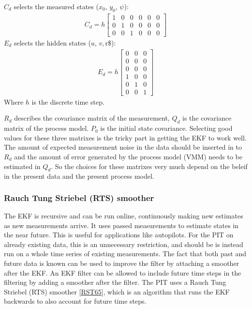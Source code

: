 \documentclass[review]{elsarticle}
\begin{document}
\sphinxAtStartPar
\(C_d\) selects the measured states (\(x_0\), \(y_0\), \(\psi\)):
\begin{equation}\label{equation:04.01_EK:eqcd}
\begin{split}\displaystyle C_{d} = h \left[\begin{matrix}1 & 0 & 0 & 0 & 0 & 0\\0 & 1 & 0 & 0 & 0 & 0\\0 & 0 & 1 & 0 & 0 & 0\end{matrix}\right]\end{split}
\end{equation}
\sphinxAtStartPar
\(E_d\) selects the hidden states (\(u\), \(v, \)r\$):
\begin{equation}\label{equation:04.01_EK:eqed}
\begin{split}\displaystyle E_{d} = h \left[\begin{matrix}0 & 0 & 0\\0 & 0 & 0\\0 & 0 & 0\\1 & 0 & 0\\0 & 1 & 0\\0 & 0 & 1\end{matrix}\right]\end{split}
\end{equation}
\sphinxAtStartPar
Where \(h\) is the discrete time step.

\sphinxAtStartPar
\(R_d\) describes the covariance matrix of the measurement, \(Q_d\) is the covariance matrix of the process model. \(P_0\) is the initial state covariance.
Selecting good values for these three matrixes is the tricky part in getting the EKF to work well. The amount of expected measurement noise in the data should be inserted in to \(R_d\) and the amount of error generated by the process model (VMM) needs to be estimated in \(Q_d\). So the choices for these matrixes very much depend on the beleif in the present data and the present process model.


\subsubsection{Rauch Tung Striebel (RTS) smoother}
\label{\detokenize{04.01_EK:rauch-tung-striebel-rts-smoother}}\label{\detokenize{04.01_EK:rts}}
\sphinxAtStartPar
The EKF is recursive and can be run online, continuously making new estimates as new measurements arrive. It uses passed measurements to estimate states in the near future. This is useful for applications like autopilots. For the PIT on already existing data, this is an unnecessary restriction, and should be is instead run on a whole time series of existing measurements. The fact that both past and future data is known can be used to improve the filter by attaching a smoother after the EKF. An EKF filter can be allowed to include future time steps in the filtering by adding a smoother after the filter. The PIT uses a Rauch Tung Striebel (RTS) smoother {[}\hyperlink{cite.bibligraphy:id67}{RST65}{]}, which is an algorithm that runs the EKF backwards to also account for future time steps.
\end{document}
